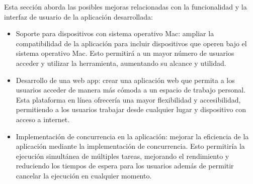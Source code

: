 Esta sección aborda las posibles mejoras relacionadas con la funcionalidad y la interfaz de usuario de la aplicación desarrollada:

\begin{itemize}
    \item Soporte para dispositivos con sistema operativo Mac: ampliar la compatibilidad de la aplicación para incluir dispositivos que operen bajo el sistema operativo Mac. Esto permitirá a un mayor número de usuarios acceder y utilizar la herramienta, aumentando su alcance y utilidad.
    \item Desarrollo de una web app: crear una aplicación web que permita a los usuarios acceder de manera más cómoda a un espacio de trabajo personal. Esta plataforma en línea ofrecería una mayor flexibilidad y accesibilidad, permitiendo a los usuarios trabajar desde cualquier lugar y dispositivo con acceso a internet.
    \item Implementación de concurrencia en la aplicación: mejorar la eficiencia de la aplicación mediante la implementación de concurrencia. Esto permitiría la ejecución simultánea de múltiples tareas, mejorando el rendimiento y reduciendo los tiempos de espera para los usuarios además de permitir cancelar la ejecución en cualquier momento.
\end{itemize}
